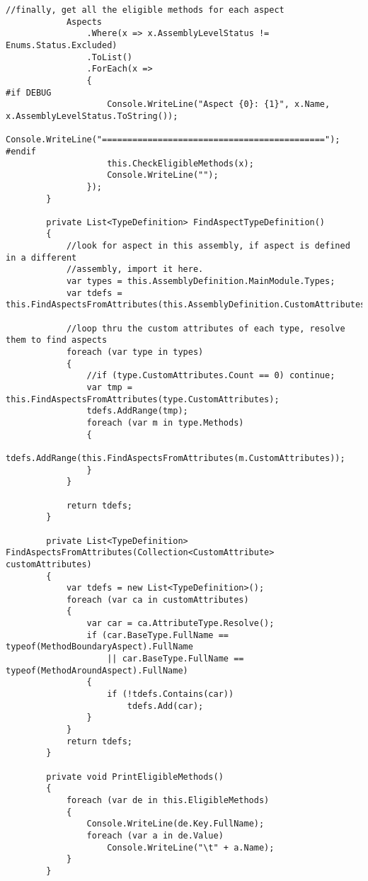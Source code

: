 \begin{lstlisting}[caption={../buffalo/Weaver.cs}, label=../buffalo/Weaver.cs, frame=tb, basicstyle=\scriptsize]
            //finally, get all the eligible methods for each aspect
            Aspects
                .Where(x => x.AssemblyLevelStatus != Enums.Status.Excluded)
                .ToList()
                .ForEach(x =>
                {
#if DEBUG
                    Console.WriteLine("Aspect {0}: {1}", x.Name, x.AssemblyLevelStatus.ToString());
                    Console.WriteLine("============================================");
#endif
                    this.CheckEligibleMethods(x);
                    Console.WriteLine("");
                });
        }

        private List<TypeDefinition> FindAspectTypeDefinition()
        {
            //look for aspect in this assembly, if aspect is defined in a different
            //assembly, import it here.
            var types = this.AssemblyDefinition.MainModule.Types;
            var tdefs = this.FindAspectsFromAttributes(this.AssemblyDefinition.CustomAttributes);

            //loop thru the custom attributes of each type, resolve them to find aspects
            foreach (var type in types)
            {
                //if (type.CustomAttributes.Count == 0) continue;
                var tmp = this.FindAspectsFromAttributes(type.CustomAttributes);
                tdefs.AddRange(tmp);
                foreach (var m in type.Methods)
                {
                    tdefs.AddRange(this.FindAspectsFromAttributes(m.CustomAttributes));
                }
            }

            return tdefs;
        }

        private List<TypeDefinition> FindAspectsFromAttributes(Collection<CustomAttribute> customAttributes)
        {
            var tdefs = new List<TypeDefinition>();
            foreach (var ca in customAttributes)
            {
                var car = ca.AttributeType.Resolve();
                if (car.BaseType.FullName == typeof(MethodBoundaryAspect).FullName
                    || car.BaseType.FullName == typeof(MethodAroundAspect).FullName)
                {
                    if (!tdefs.Contains(car))
                        tdefs.Add(car);
                }
            }
            return tdefs;
        }

        private void PrintEligibleMethods()
        {
            foreach (var de in this.EligibleMethods)
            {
                Console.WriteLine(de.Key.FullName);
                foreach (var a in de.Value)
                    Console.WriteLine("\t" + a.Name);
            }
        }


\end{lstlisting}
